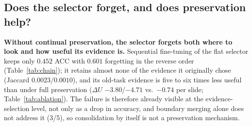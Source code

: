 \documentclass{article}
\begin{document}
\subsection{Does the selector forget, and does preservation help?}
\label{ssec:ablation}

\begin{table}[!htb]
\centering\footnotesize\renewcommand{\arraystretch}{0.92}
\setlength{\tabcolsep}{4pt}
\caption{\textbf{Leave-out chain in both task orders} (TCGA continual WSI benchmark, ten-fold CV; ACC mean$\pm$sd, forgetting mean). Reverse = ESCA$\rightarrow$RCC$\rightarrow$BRCA$\rightarrow$LUNG; forward = the opposite. The zero-shot reference selects the eight patches with the highest class-text cosine, pools them uniformly, and uses the frozen head; it learns nothing. Last two rows: the strongest published method, as reported in \cite{gou2025qpmil} and as rerun by us with its released code.}
\label{tab:chain}
\end{table}

\textbf{Without continual preservation, the selector forgets both where to look and how useful its evidence is.} Sequential fine-tuning of the flat selector keeps only $0.452$ ACC with $0.601$ forgetting in the reverse order (Table~\ref{tab:chain}); it retains almost none of the evidence it originally chose (Jaccard $0.0023$/$0.0010$), and its old-task evidence is five to six times less useful than under full preservation ($\Delta U$ $-3.80$/$-4.71$ vs.\ $-0.74$ per slide; Table~\ref{tab:ablation}). The failure is therefore already visible at the evidence-selection level, not only as a drop in accuracy, and boundary merging alone does not address it (3/5), so consolidation by itself is not a preservation mechanism.
\end{document}
